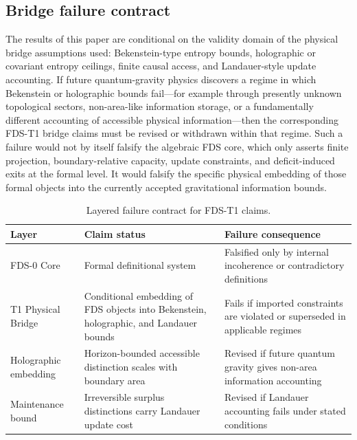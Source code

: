 \documentclass[10pt,a4paper,twocolumn,aps,prl]{revtex4-2}
\begin{document}
\subsection{Bridge failure contract}

The results of this paper are conditional on the validity domain of the physical bridge assumptions used: Bekenstein-type entropy bounds, holographic or covariant entropy ceilings, finite causal access, and Landauer-style update accounting. If future quantum-gravity physics discovers a regime in which Bekenstein or holographic bounds fail---for example through presently unknown topological sectors, non-area-like information storage, or a fundamentally different accounting of accessible physical information---then the corresponding FDS-T1 bridge claims must be revised or withdrawn within that regime. Such a failure would not by itself falsify the algebraic FDS core, which only asserts finite projection, boundary-relative capacity, update constraints, and deficit-induced exits at the formal level. It would falsify the specific physical embedding of those formal objects into the currently accepted gravitational information bounds.

\begin{table}[t!]
\centering
\small
\caption{Layered failure contract for FDS-T1 claims.}
\renewcommand{\arraystretch}{1.25}
\begin{tabular}{lll}
\toprule
Layer & Claim status & Failure consequence \\
\midrule
FDS-0 Core 
& \parbox[t]{4.5cm}{\raggedright Formal definitional system\vphantom{y}}
& \parbox[t]{4.5cm}{\raggedright Falsified only by internal incoherence or contradictory definitions} \\
\midrule
T1 Physical Bridge 
& \parbox[t]{4.5cm}{\raggedright Conditional embedding of FDS objects into Bekenstein, holographic, and Landauer bounds}
& \parbox[t]{4.5cm}{\raggedright Fails if imported constraints are violated or superseded in applicable regimes} \\
\midrule
Holographic embedding 
& \parbox[t]{4.5cm}{\raggedright Horizon-bounded accessible distinction scales with boundary area}
& \parbox[t]{4.5cm}{\raggedright Revised if future quantum gravity gives non-area information accounting} \\
\midrule
Maintenance bound 
& \parbox[t]{4.5cm}{\raggedright Irreversible surplus distinctions carry Landauer update cost}
& \parbox[t]{4.5cm}{\raggedright Revised if Landauer accounting fails under stated conditions} \\
\bottomrule
\end{tabular}
\label{tab:failure-contract}
\end{table}
\end{document}
